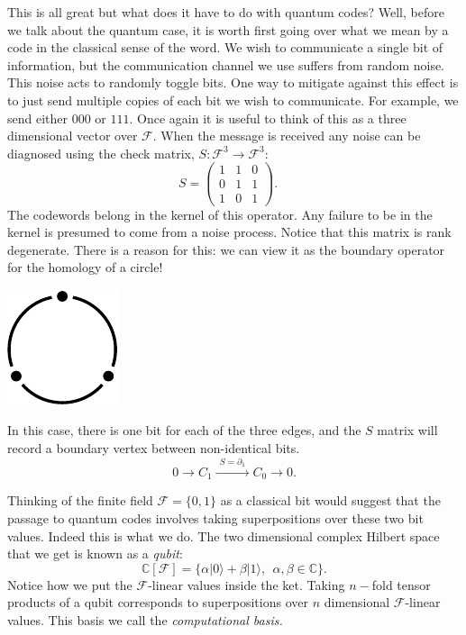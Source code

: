 \documentclass[11pt,oneside]{report}
\def\Complex{\mathbb{C}}
\newcommand{\ket}[1]{|{#1}\rangle}
\newcommand{\Field}{\mathcal{F}}
\begin{document}
This is all great but what does it have to do with quantum codes?
Well, before we talk about the quantum case,
it is worth first going over what we
mean by a code in the classical sense of the word.
We wish to communicate a single bit of information, 
but the communication channel we use suffers from random noise.
This noise acts to randomly toggle bits.
One way to mitigate against this effect is to just
send multiple copies of each bit we wish to communicate.
For example, we send either $000$ or $111$.
Once again it is useful to think of this as a three
dimensional vector over $\Field.$
When the message is received any noise can be diagnosed
using the check matrix, $S:\Field^3\to\Field^3:$
$$
S = \left( \begin{array}{lll}
1&1&0\\
0&1&1\\
1&0&1
\end{array} \right).\quad
$$
The codewords belong in the kernel of this operator.
Any failure to be in the kernel is presumed to come
from a noise process.
Notice that this matrix is rank degenerate.
There is a reason for this: we can view it as
the boundary operator for the homology of a circle!
\begin{center}
\includegraphics{pic-circle-hom.pdf}
\end{center}
In this case, there is one bit for each of the three
edges, and the $S$ matrix will record a boundary vertex
between non-identical bits.
$$
  0 \xrightarrow{\ \ \ \ } 
    C_1 \xrightarrow{\ \ S=\partial_1\ \ } 
    C_0 \xrightarrow{\ \ \ \ } 0.
$$

Thinking of the finite field $\Field=\{0,1\}$ as a classical
bit would suggest that the passage to quantum codes involves
taking superpositions over these two bit values.
Indeed this is what we do.
The two dimensional complex Hilbert space that we get
is known as a \emph{qubit}:
$$
    \Complex[\Field] = \{ \alpha \ket{0} + \beta \ket{1}, \ \ \alpha,\beta\in \Complex \}.
$$
Notice how we put the $\Field$-linear values inside the ket.
Taking $n-$fold tensor products
of a qubit corresponds to superpositions over
$n$ dimensional $\Field$-linear values.
This basis we call the \emph{computational basis.}
\end{document}
